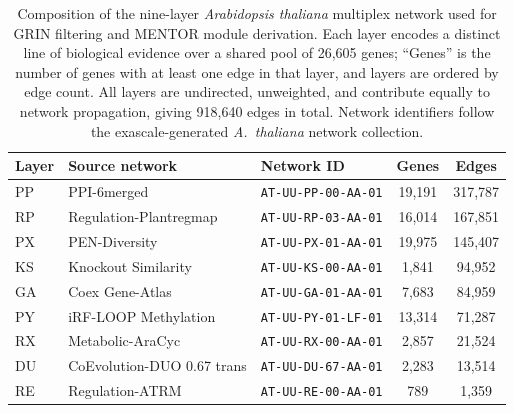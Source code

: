 \begin{table}[htbp]
    \centering
    \caption[Composition of the nine-layer \textit{Arabidopsis thaliana} multiplex network used for GRIN filtering and MENTOR module derivation]{Composition of the nine-layer \textit{Arabidopsis thaliana} multiplex network used for GRIN filtering and MENTOR module derivation. Each layer encodes a distinct line of biological evidence over a shared pool of 26,605 genes; ``Genes'' is the number of genes with at least one edge in that layer, and layers are ordered by edge count. All layers are undirected, unweighted, and contribute equally to network propagation, giving 918,640 edges in total. Network identifiers follow the exascale-generated \textit{A.\ thaliana} network collection.}\label{tbl:multiplex-layers}
    \small
    \setlength{\tabcolsep}{6pt}
    \renewcommand{\arraystretch}{1.1}
    \begin{tabularx}{\textwidth}{@{}l >{\raggedright\arraybackslash}X l c c@{}}
        \toprule
        Layer & Source network & Network ID & Genes & Edges \\
        \midrule
        PP & PPI-6merged & \texttt{AT-UU-PP-00-AA-01} & 19,191 & 317,787 \\
        RP & Regulation-Plantregmap & \texttt{AT-UU-RP-03-AA-01} & 16,014 & 167,851 \\
        PX & PEN-Diversity & \texttt{AT-UU-PX-01-AA-01} & 19,975 & 145,407 \\
        KS & Knockout Similarity & \texttt{AT-UU-KS-00-AA-01} & 1,841 & 94,952 \\
        GA & Coex Gene-Atlas & \texttt{AT-UU-GA-01-AA-01} & 7,683 & 84,959 \\
        PY & iRF-LOOP Methylation & \texttt{AT-UU-PY-01-LF-01} & 13,314 & 71,287 \\
        RX & Metabolic-AraCyc & \texttt{AT-UU-RX-00-AA-01} & 2,857 & 21,524 \\
        DU & CoEvolution-DUO 0.67 trans & \texttt{AT-UU-DU-67-AA-01} & 2,283 & 13,514 \\
        RE & Regulation-ATRM & \texttt{AT-UU-RE-00-AA-01} & 789 & 1,359 \\
        \bottomrule
    \end{tabularx}
\end{table}
